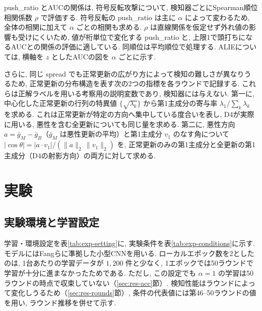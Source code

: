 \documentclass[a4j, dvipdfmx]{jsarticle}
\newcommand{\PushRatio}{\textrm{push\_ratio}}
\newcommand{\Spread}{\textrm{spread}}
\begin{document}
\PushRatio{} とAUCの関係は, 符号反転攻撃について, 検知器ごとにSpearman順位相関係数 $\rho$ で評価する. 符号反転の \PushRatio{} は主に $\alpha$ によって変わるため, 全体の相関に加えて $\alpha$ ごとの相関も求める. $\rho$ は直線関係を仮定せず外れ値の影響も受けにくいため, 値が桁単位で変化する \PushRatio{} と, 上限1で頭打ちになるAUCとの関係の評価に適している. 同順位は平均順位で処理する. ALIEについては, 横軸を $z$ としたAUCの図を $\alpha$ ごとに示す.

さらに, 同じ \Spread{} でも正常更新の広がり方によって検知の難しさが異なりうるため, 正常更新の分布構造を表す次の2つの指標を各ラウンドで記録する. これらは正解ラベルを用いる考察用の説明変数であり, 検知器には与えない. 第一に, 中心化した正常更新の行列の特異値 $\{\sqrt{\lambda_k}\}$ から第1主成分の寄与率 $\lambda_1 / \sum_k \lambda_k$ を求める. これは正常更新が特定の方向へ集中している度合いを表し, D4が実際に用いる, 悪性を含む全更新についても同じ量を求める. 第二に, 悪性方向 $a = \bar{g}_M - \bar{g}_B$（$\bar{g}_M$ は悪性更新の平均）と第1主成分 $v_1$ のなす角について $|\cos\theta| = |a \cdot v_1| / (\|a\|_2\,\|v_1\|_2)$ を, 正常更新のみの第1主成分と全更新の第1主成分（D4の射影方向）の両方に対して求める.

\section{実験}
\label{sec:experiment}

\subsection{実験環境と学習設定}
\label{sec:exp-setting}

学習・環境設定を表\ref{tab:exp-setting}に, 実験条件を表\ref{tab:exp-conditions}に示す. モデルにはFangら\cite{fang2020local}に準拠した小型CNNを用いる. ローカルエポック数を2としたのは, 1台あたりの学習データが $1{,}200$ 件と少なく, 1エポックでは50ラウンドで学習が十分に進まなかったためである. ただし, この設定でも $\alpha=1$ の学習は50ラウンドの時点で収束していない（\ref{sec:res-acc}節）. 検知性能はラウンドによって変化しうるため（\ref{sec:res-rounds}節）, 条件の代表値には第46--50ラウンドの値を用い, ラウンド推移を併せて示す.
\end{document}
